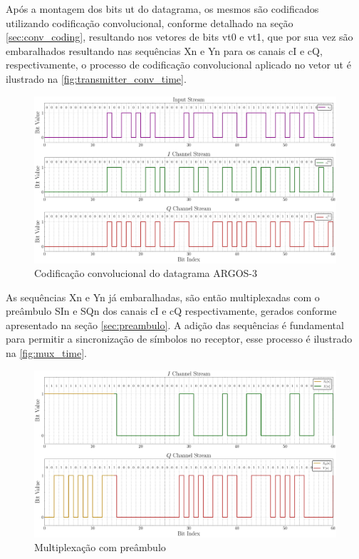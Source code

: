 Após a montagem dos bits \gls{ut} do datagrama, os mesmos são codificados utilizando codificação convolucional, conforme detalhado na seção \ref{sec:conv_coding}, resultando nos vetores de bits \gls{vt0} e \gls{vt1}, que por sua vez são embaralhados resultando nas sequências \gls{Xn} e \gls{Yn} para os canais \gls{cI} e \gls{cQ}, respectivamente, o processo de codificação convolucional aplicado no vetor \gls{ut} é ilustrado na \autoref{fig:transmitter_conv_time}.

\begin{figure}[H]
	\centering
	\caption{Codificação convolucional do datagrama ARGOS-3}\label{fig:transmitter_conv_time}
	\includegraphics[width=\linewidth]{assets/cap3/transmitter_conv_time.pdf}
\end{figure}

As sequências \gls{Xn} e \gls{Yn} já embaralhadas, são então multiplexadas com o preâmbulo \gls{SIn} e \gls{SQn} dos canais \gls{cI} e \gls{cQ} respectivamente, gerados conforme apresentado na seção \ref{sec:preambulo}. A adição das sequências é fundamental para permitir a sincronização de símbolos no receptor, esse processo é ilustrado na \autoref{fig:mux_time}.

\begin{figure}[H]
	\centering
	\caption{Multiplexação com preâmbulo}\label{fig:mux_time}
	\includegraphics[width=\linewidth]{assets/cap3/transmitter_mux_time.pdf}
\end{figure}

